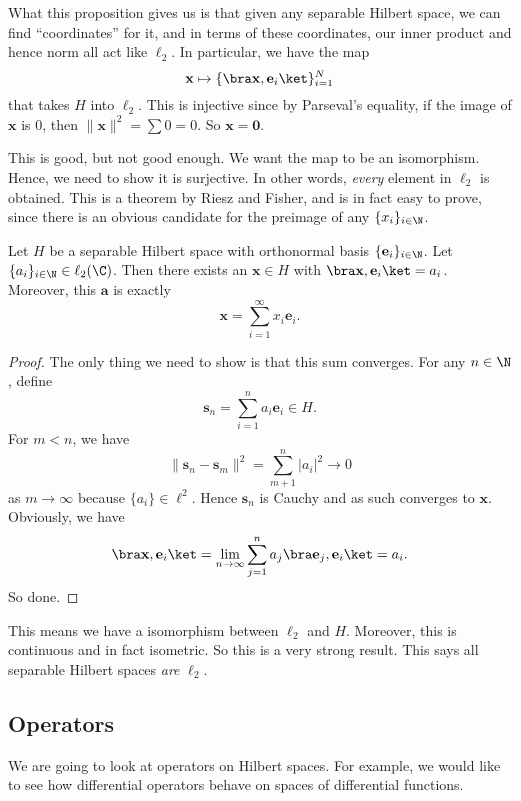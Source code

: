 \documentclass[a4paper]{article}
\begin{document}
What this proposition gives us is that given any separable Hilbert space, we can find ``coordinates'' for it, and in terms of these coordinates, our inner product and hence norm all act like $\ell_2$. In particular, we have the map
\[
  \mathbf{x} \mapsto \{\bra \mathbf{x}, \mathbf{e}_i\ket \}_{i = 1}^N
\]
that takes $H$ into $\ell_2$. This is injective since by Parseval's equality, if the image of $\mathbf{x}$ is $0$, then $\|\mathbf{x}\|^2 = \sum 0 = 0$. So $\mathbf{x} = \mathbf{0}$.

This is good, but not good enough. We want the map to be an isomorphism. Hence, we need to show it is surjective. In other words, \emph{every} element in $\ell_2$ is obtained. This is a theorem by Riesz and Fisher, and is in fact easy to prove, since there is an obvious candidate for the preimage of any $\{x_i\}_{i \in \N}$.

\begin{prop}
  Let $H$ be a separable Hilbert space with orthonormal basis $\{\mathbf{e}_i\}_{i \in \N}$. Let $\{a_i\}_{i \in \N} \in \ell_2(\C)$. Then there exists an $\mathbf{x} \in H$ with $\bra \mathbf{x}, \mathbf{e}_i \ket = a_i$. Moreover, this $\mathbf{a}$ is exactly
  \[
    \mathbf{x} = \sum_{i = 1}^\infty x_i \mathbf{e}_i.
  \]
\end{prop}

\begin{proof}
  The only thing we need to show is that this sum converges. For any $n \in \N$, define
  \[
    \mathbf{s}_n = \sum_{i = 1}^n a_i \mathbf{e}_i \in H.
  \]
  For $m < n$, we have
  \[
    \|\mathbf{s}_n - \mathbf{s}_m\|^2 = \sum_{m + 1}^n |a_i|^2 \to 0
  \]
  as $m \to \infty$ because $\{a_i\} \in \ell^2$. Hence $\mathbf{s}_n$ is Cauchy and as such converges to $\mathbf{x}$. Obviously, we have
  \[
    \bra \mathbf{x}, \mathbf{e}_i\ket = \lim_{n \to \infty} \sum_{j = 1}^n a_j \bra \mathbf{e}_j, \mathbf{e}_i \ket = a_i.
  \]
  So done.
\end{proof}
This means we have a isomorphism between $\ell_2$ and $H$. Moreover, this is continuous and in fact isometric. So this is a very strong result. This says all separable Hilbert spaces \emph{are} $\ell_2$.
\subsection{Operators}
We are going to look at operators on Hilbert spaces. For example, we would like to see how differential operators behave on spaces of differential functions.
\end{document}
